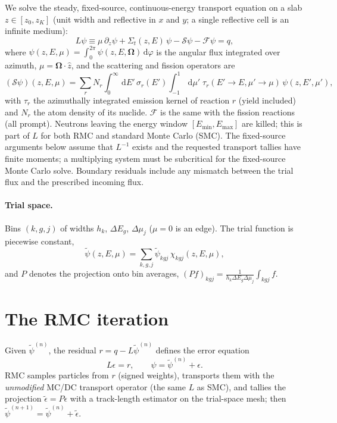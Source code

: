 \documentclass[11pt]{article}
\newcommand{\dd}{\,\mathrm{d}}
\newcommand{\tpsi}{\tilde\psi}
\newcommand{\teps}{\tilde\epsilon}
\newcommand{\Sigt}{\Sigma_t}
\begin{document}
We solve the steady, fixed-source, continuous-energy transport equation on a slab
$z\in[z_0,z_K]$ (unit width and reflective in $x$ and $y$; a single reflective cell is
an infinite medium):
\begin{equation}
  L\psi \equiv \mu\,\partial_z\psi + \Sigt(z,E)\,\psi - \mathcal S\psi - \mathcal F\psi = q,
  \label{eq:transport}
\end{equation}
where $\psi(z,E,\mu)=\int_0^{2\pi}\psi(z,E,\bm\Omega)\dd\varphi$ is the angular flux
integrated over azimuth, $\mu=\bm\Omega\cdot\hat z$, and the scattering and fission
operators are
\begin{equation}
  (\mathcal S\psi)(z,E,\mu)=\sum_r N_r\int_0^\infty\!\dd E'\,\sigma_r(E')\int_{-1}^{1}\!\dd\mu'\;
  \tau_r(E'\!\to E,\mu'\!\to\mu)\,\psi(z,E',\mu'),
  \label{eq:scatter}
\end{equation}
with $\tau_r$ the azimuthally integrated emission kernel of reaction $r$ (yield
included) and $N_r$ the atom density of its nuclide. $\mathcal F$ is the same with the
fission reactions (all prompt). Neutrons leaving the energy window
$[E_{\min},E_{\max}]$ are killed; this is part of $L$ for both RMC and standard Monte
Carlo (SMC).
The fixed-source arguments below assume that $L^{-1}$ exists and the requested
transport tallies have finite moments; a multiplying system must be subcritical
for the fixed-source Monte Carlo solve. Boundary residuals include any mismatch
between the trial flux and the prescribed incoming flux.

\paragraph{Trial space.} Bins $(k,g,j)$ of widths $h_k$, $\Delta E_g$, $\Delta\mu_j$
($\mu=0$ is an edge). The trial function is piecewise constant,
\begin{equation}
  \tpsi(z,E,\mu)=\sum_{k,g,j}\tpsi_{kgj}\,\chi_{kgj}(z,E,\mu),
\end{equation}
and $P$ denotes the projection onto bin averages,
$(Pf)_{kgj}=\frac{1}{h_k\Delta E_g\Delta\mu_j}\int_{kgj}f$.

\section{The RMC iteration}

Given $\tpsi^{(n)}$, the residual $r=q-L\tpsi^{(n)}$ defines the error equation
\begin{equation}
  L\epsilon = r,\qquad \psi=\tpsi^{(n)}+\epsilon .
\end{equation}
RMC samples particles from $r$ (signed weights), transports them with the
\emph{unmodified} MC/DC transport operator (the same $L$ as SMC), and tallies the
projection $\teps=P\epsilon$ with a track-length estimator on the trial-space mesh;
then $\tpsi^{(n+1)}=\tpsi^{(n)}+\teps$.
\end{document}
